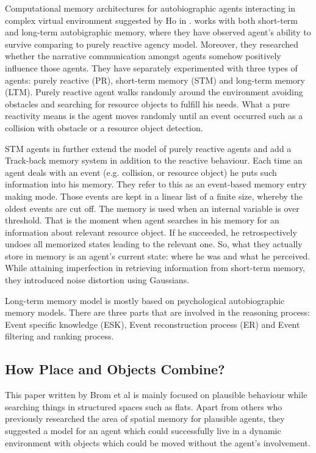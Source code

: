 Computational memory architectures for autobiographic agents interacting in complex virtual environment suggested by Ho in \cite{Ho:memoryarchitectures}. works with both short-term and long-term autobigraphic memory, where they have observed agent’s ability to survive comparing to purely reactive agency model. Moreover, they researched whether the narrative communication amongst agents somehow positively influence those agents. They have separately experimented with three types of agents: purely reactive (PR), short-term memory (STM) and long-term memory (LTM). Purely reactive agent walks randomly around the environment avoiding obstacles and searching for resource objects to fulfill his needs. What a pure reactivity means is the agent moves randomly until an event occurred such as a collision with obstacle or a resource object detection.

STM agents in \cite{Ho:memoryarchitectures} further extend the model of purely reactive agents and add a Track-back memory system in addition to the reactive behaviour. Each time an agent deals with an event (e.g. collision, or resource object) he puts such information into his memory. They refer to this as an event-based memory entry making mode. Those events are kept in a linear list of a finite size, whereby the oldest events are cut off. The memory is used when an internal variable is over threshold. That is the moment when agent searches in his memory for an information about relevant resource object. If he succeeded, he retrospectively undoes all memorized states leading to the relevant one. So, what they actually store in memory is an agent’s current state: where he was and what he perceived. While attaining imperfection in retrieving information from short-term memory, they introduced noise distortion using Gaussians.

Long-term memory model is mostly based on psychological autobiographic memory models. There are three parts that are involved in the reasoning process: Event specific knowledge (ESK), Event reconstruction process (ER) and Event filtering and ranking process.

\subsection{How Place and Objects Combine?}

This paper written by Brom et al \cite{Brom:placeandobjects} is mainly focused on plausible behaviour while searching things in structured spaces such as flats. Apart from others who previously researched the area of spatial memory for plausible agents, they suggested a model for an agent which could successfully live in a dynamic environment with objects which could be moved without the agent’s involvement. 

